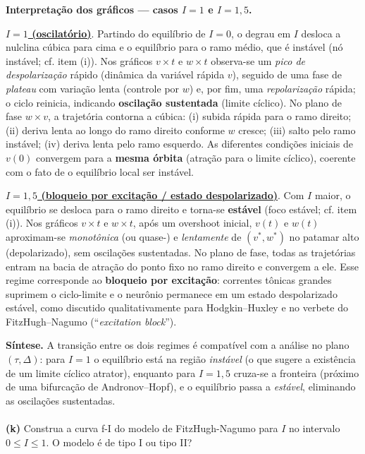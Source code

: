 \documentclass[english,11pt,a4paper]{article}
\begin{document}
	\noindent\textbf{Interpretação dos gráficos — casos $I=1$ e $I=1{,}5$.}
	
	\medskip
	\underline{\textbf{$I=1$ (oscilatório)}}.
	Partindo do equilíbrio de $I=0$, o degrau em $I$ desloca a nulclina cúbica para cima e o equilíbrio para o ramo médio, que é instável (nó instável; cf. item (i)). 
	Nos gráficos $v\times t$ e $w\times t$ observa-se um \emph{pico de despolarização} rápido (dinâmica da variável rápida $v$), seguido de uma fase de \emph{plateau} com variação lenta (controle por $w$) e, por fim, uma \emph{repolarização} rápida; o ciclo reinicia, indicando \textbf{oscilação sustentada} (limite cíclico). 
	No plano de fase $w\times v$, a trajetória contorna a cúbica: (i) subida rápida para o ramo direito; (ii) deriva lenta ao longo do ramo direito conforme $w$ cresce; (iii) salto pelo ramo instável; (iv) deriva lenta pelo ramo esquerdo. 
	As diferentes condições iniciais de $v(0)$ convergem para a \textbf{mesma órbita} (atração para o limite cíclico), coerente com o fato de o equilíbrio local ser instável.
	
	\medskip
	\underline{\textbf{$I=1{,}5$ (bloqueio por excitação / estado despolarizado)}}.
	Com $I$ maior, o equilíbrio se desloca para o ramo direito e torna-se \textbf{estável} (foco estável; cf. item (i)).
	Nos gráficos $v\times t$ e $w\times t$, após um overshoot inicial, $v(t)$ e $w(t)$ aproximam-se \emph{monotônica} (ou quase-) e \emph{lentamente} de $(v^*,w^*)$ no patamar alto (depolarizado), sem oscilações sustentadas. 
	No plano de fase, todas as trajetórias entram na bacia de atração do ponto fixo no ramo direito e convergem a ele.
	Esse regime corresponde ao \textbf{bloqueio por excitação}: correntes tônicas grandes suprimem o ciclo-limite e o neurônio permanece em um estado despolarizado estável, como discutido qualitativamente para Hodgkin--Huxley e no verbete do FitzHugh--Nagumo (``\textit{excitation block}'').
	
	\medskip
	\noindent\textbf{Síntese.} 
	A transição entre os dois regimes é compatível com a análise no plano $(\tau,\Delta)$: para $I=1$ o equilíbrio está na região \emph{instável} (o que sugere a existência de um limite cíclico atrator), enquanto para $I=1{,}5$ cruza-se a fronteira (próximo de uma bifurcação de Andronov--Hopf), e o equilíbrio passa a \emph{estável}, eliminando as oscilações sustentadas.\\\\
	
	
	\noindent\textbf{(k)} Construa a curva f-I do modelo de FitzHugh-Nagumo para $I$ no intervalo $0 \leq I \leq 1$. O modelo é de tipo I ou tipo II?\\
	
\end{document}
